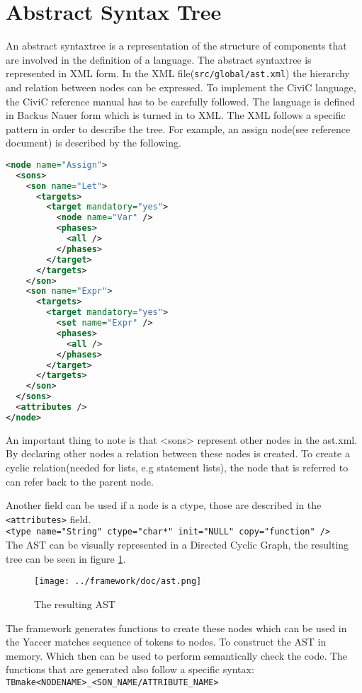 \documentclass[a4paper]{article}
\begin{document}
\section{Abstract Syntax Tree}
An abstract syntaxtree is a representation of the structure of components that
are involved in the definition of a language.
The abstract syntaxtree is represented in XML form. In the XML
file(\texttt{src/global/ast.xml}) the hierarchy and relation between nodes can
be expressed. To implement the CiviC language, the CiviC reference manual has
to be carefully followed. The language is defined in Backus Nauer form which is
turned in to XML. The XML follows a specific pattern in order to describe the tree.
For example, an assign node(see reference document) is described by the
following.

\begin{lstlisting}[language=XML]
 <node name="Assign">
  <sons>
    <son name="Let">
      <targets>
        <target mandatory="yes">
          <node name="Var" />
          <phases>
            <all />
          </phases>
        </target>
      </targets>
    </son>
    <son name="Expr">
      <targets>
        <target mandatory="yes">
          <set name="Expr" />
          <phases>
            <all />
          </phases>
        </target>
      </targets>
    </son>
  </sons>
  <attributes />
</node>
\end{lstlisting}

An important thing to note is that <sons> represent other nodes in the ast.xml.
By declaring other nodes a relation between these nodes is created. To create a cyclic
relation(needed for lists, e.g statement lists), the node that is referred to can refer back to the parent node.

Another field can be used if a node is a ctype, those are described in the \texttt{<attributes>} field.\\
\texttt{<type name="String" ctype="char*" init="NULL" copy="function" />}
\\
The AST can be visually represented in a Directed Cyclic Graph, the resulting
tree can be seen in figure \ref{fig:ast.png}.

\begin{figure}[h!]
    \texttt{[image: ../framework/doc/ast.png]}
\label{fig:ast.png}
\caption{The resulting AST}
\end{figure}

The framework generates functions to create these nodes which can be used in
the Yaccer matches sequence of tokens to nodes. To construct the AST in memory.
Which then can be used to perform semantically check the code. The functions
that are generated also follow a specific syntax:\\
\texttt{TBmake<NODENAME>\_<SON\_NAME/ATTRIBUTE\_NAME>}
\end{document}
